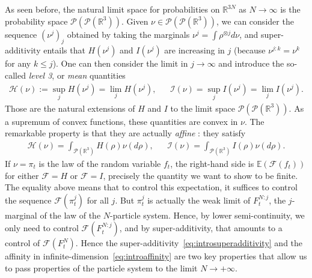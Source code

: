 \documentclass[11pt,a4paper]{article}
\theoremstyle{definition}
\theoremstyle{plain}
\begin{document}
As seen before, the natural limit space for probabilities on $\mathbb{R}^{3N}$ as $N\rightarrow\infty$ is the probability space $\mathcal{P}(\mathcal{P}(\mathbb{R}^{3}))$. Given $\nu \in \mathcal{P}(\mathcal{P}(\mathbb{R}^3))$, we can consider the sequence $(\nu^j)_j$ obtained by taking the marginals $\nu^j=\int\rho^{\otimes j} d\nu$, and super-additivity entails that $H(\nu^j)$ and $I(\nu^j)$ are increasing in $j$ (because $\nu^{j:k}=\nu^k$ for any $k\leq j$). One can then consider the limit in $j\rightarrow\infty$ and introduce the so-called \textit{level 3}, or \textit{mean} quantities
\begin{align*}
    \mathcal{H}(\nu):=\sup_j H(\nu^j)= \lim_j H(\nu^j), && \mathcal{I}(\nu)=\sup_j I(\nu^j)= \lim_j I(\nu^j).
\end{align*}
Those are the natural extensions of $H$ and $I$ to the limit space $\mathcal{P}(\mathcal{P}(\mathbb{R}^{3}))$. As a supremum of convex functions, these quantities are convex in $\nu$. The remarkable property is that they are actually \textit{affine} \cite{HaurayMischler2012, RobinsonRuelle1967, Rougerie2020}: they satisfy
\begin{align}
\label{eq:introaffinity}
    \mathcal{H}(\nu)=\int_{\mathcal{P}(\mathbb{R}^3)} H(\rho) \nu(d\rho), && \mathcal{I}(\nu)=\int_{\mathcal{P}(\mathbb{R}^3)} I(\rho) \nu(d\rho).
\end{align}
If $\nu=\pi_t$ is the law of the random variable $f_t$, the right-hand side is $\mathbb{E}(\mathcal{F}(f_t))$ for either $\mathcal{F}=H$ or $\mathcal{F}=I$, precisely the quantity we want to show to be finite. The equality above means that to control this expectation, it suffices to control the sequence $\mathcal{F}(\pi_t^j)$ for all $j$. But $\pi_t^j$ is actually the weak limit of $F_t^{N:j}$, the $j$-marginal of the law of the $N$-particle system. Hence, by lower semi-continuity, we only need to control $\mathcal{F}(F_t^{N:j})$, and by super-additivity, that amounts to a control of $\mathcal{F}(F_t^{N})$. Hence the super-additivity~\eqref{eq:introsuperadditivity} and the affinity in infinite-dimension~\eqref{eq:introaffinity} are two key properties that allow us to pass properties of the particle system to the limit $N\rightarrow +\infty$.
\end{document}
